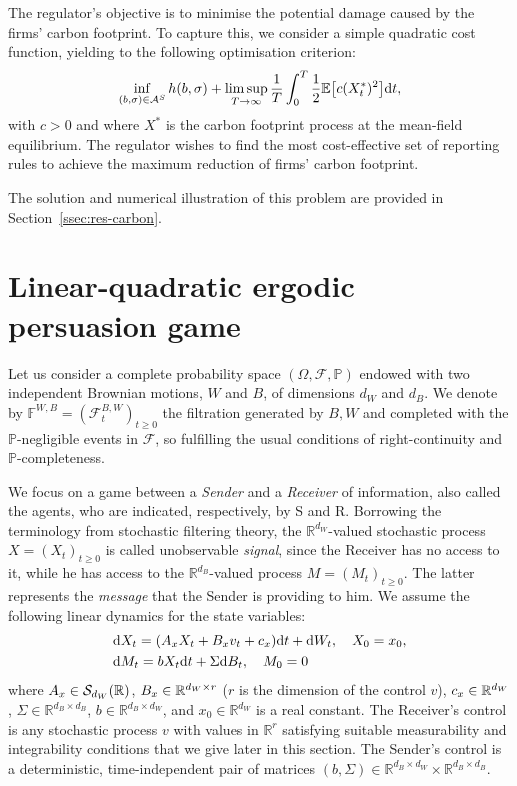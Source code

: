 \documentclass[a4paper,10pt]{article}
\newcommand{\EE}{\mathbb{E}}
\newcommand{\RR}{\mathbb{R}}
\newcommand{\D}{\mathrm{d}}
\theoremstyle{definition}
\theoremstyle{plain}
\numberwithin{equation}{section}
\begin{document}
The regulator's objective is to minimise the potential damage caused by the firms' carbon footprint. To capture this, we consider a simple quadratic cost function, yielding to the following optimisation criterion:
\begin{align}
    \inf_{(b,\sigma) \in \mathcal A^{\rm S}} h(b,\sigma) +  \limsup_{T \to \infty} \frac{1}{T} \int_0 ^T \frac12 \EE\big[   c (X_t^*)^2\big] \D t, 
\end{align}
with $c>0$ and where $X^\ast$ is the carbon footprint process at the mean-field equilibrium. 
The regulator wishes to find the most cost-effective set of reporting rules to achieve the maximum reduction of firms' carbon footprint. 

\medskip

The solution and numerical illustration of this problem are provided in Section~\ref{ssec:res-carbon}.

\section{Linear-quadratic ergodic persuasion game}\label{sec:theory}

Let us consider a complete probability space $(\Omega, \mathcal{F}, \mathbb{P})$ endowed with two independent Brownian motions, $W$ and $B$, of dimensions $d_W$ and $d_B$. We denote by $\mathbb F^{W,B} = (\mathcal F_t^{B,W})_{t\geq 0}$ the filtration generated by $B,W$ and completed with the $\mathbb P$-negligible events in $\mathcal F$, so fulfilling the usual conditions of right-continuity and $\mathbb P$-completeness.
 
We focus on a game between a \emph{Sender} and a \emph{Receiver} of information, also called the agents, who are indicated, respectively, by S and R.  
Borrowing the terminology from stochastic filtering theory, the $\RR^{d_W}$-valued stochastic process $X= (X_t)_{t \geq 0}$ is called unobservable \textit{signal}, since the Receiver has no access to it, while he has access to the $\RR^{d_B}$-valued process $M = (M_t)_{t \geq 0}$. 
The latter represents the \emph{message} that the Sender is providing to him. We assume the following linear dynamics for the state variables: 
\begin{align}	
	& \D X_t = (A_{\rm x} X_t + B_{\rm x} v_t + c_{\rm x})\D t +  \D W_t , \quad X_0=x_0, \label{dynX-gen} \\
	& \D M_t = b X_t \D t +  \Sigma \D B_t, \quad M_0=0  \label{dynM-gen}
\end{align}
where $A_{\rm x} \in \mathcal S_{d_W}(\RR) $, $B_{\rm x}\in \RR^{d_W\times r}$ ($r$ is the dimension of the control $v$), $c_{\rm x} \in \RR^{d_W}$, $\Sigma \in \RR^{d_B \times d_B}$, $b \in \RR^{d_B \times d_W}$, and $x_0 \in\RR^{d_W}$ is a real constant.
The Receiver's control is any stochastic process $v$ with values in $\RR^r$ satisfying suitable measurability and integrability conditions that we give later in this section. The Sender's control is a deterministic, time-independent pair of matrices $(b, \Sigma)\in \RR^{d_B\times d_W} \times \RR^{d_B \times d_B}$.
\end{document}
